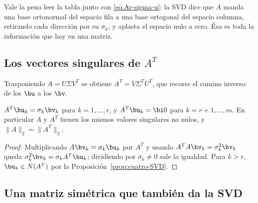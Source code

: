 \begin{remark}
Vale la pena leer la tabla junto con \eqref{eq:Av-sigma-u}: la SVD dice que
$A$ manda una base ortonormal del espacio fila a una base ortogonal del
espacio columna, estirando cada dirección por su $\sigma_k$, y aplasta el
espacio nulo a cero. Ésa es toda la información que hay en una matriz.
\end{remark}

\subsection{Los vectores singulares de $A^T$}

Trasponiendo $A=U\Sigma V^T$ se obtiene $A^T=V\Sigma^TU^T$, que recorre el
camino inverso: de los $\bu$ a los $\bv$.

\begin{proposition}\label{prop:AT}
$A^T\bu_k=\sigma_k\bv_k$ para $k=1,\dots,r$, y $A^T\bu_k=\bi 0$ para
$k=r+1,\dots,m$. En particular $A$ y $A^T$ tienen los mismos valores
singulares no nulos, y $\|A\|_2=\|A^T\|_2$.
\end{proposition}

\begin{proof}
Multiplicando $A\bv_k=\sigma_k\bu_k$ por $A^T$ y usando
$A^TA\bv_k=\sigma_k^2\bv_k$ queda $\sigma_k^2\bv_k=\sigma_kA^T\bu_k$;
dividiendo por $\sigma_k\neq0$ sale la igualdad. Para $k>r$, $\bu_k\in N(A^T)$
por la Proposición~\ref{prop:cuatro-SVD}.
\end{proof}

\subsection{Una matriz simétrica que también da la SVD}

